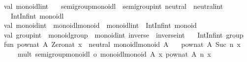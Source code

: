 \begin{isabellebody}
\begin{isamarkuptext}
\isanewline
val\ monoidl{}int\ {}\isanewline
\ \ {}semigroup{}monoidl\ {}\ semigroup{}int{}\ neutral\ {}\ neutral{}int{}\ {}\isanewline
\ \ IntInf{}int\ monoidl{}\isanewline
\isanewline
val\ monoid{}int\ {}\ {}monoidl{}monoid\ {}\ monoidl{}int{}\ {}\ IntInf{}int\ monoid{}\isanewline
\isanewline
val\ group{}int\ {}\ {}monoid{}group\ {}\ monoid{}int{}\ inverse\ {}\ inverse{}int{}\ {}\isanewline
\ \ IntInf{}int\ group{}\isanewline
\isanewline
fun\ pow{}nat\ A{}\ Zero{}nat\ x\ {}\ neutral\ {}monoidl{}monoid\ A{}{}\isanewline
\ \ {}\ pow{}nat\ A{}\ {}Suc\ n{}\ x\ {}\isanewline
\ \ \ \ mult\ {}{}semigroup{}monoidl\ o\ monoidl{}monoid{}\ A{}{}\ x\ {}pow{}nat\ A{}\ n\ x{}{}\isanewline

\end{isamarkuptext}
\end{isabellebody}
